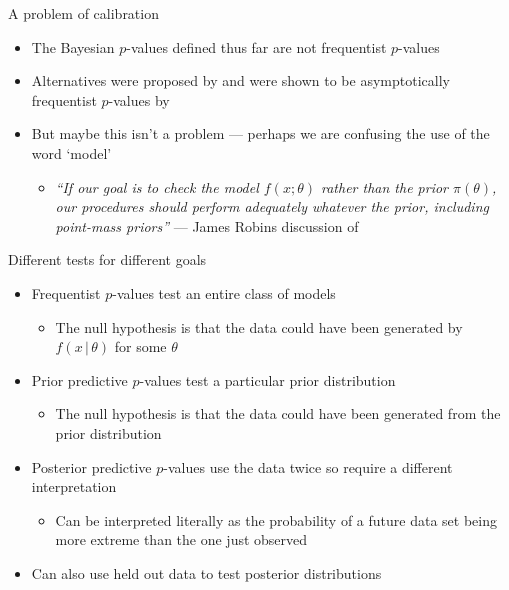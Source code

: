 \begin{frame}{A problem of calibration}
  \begin{itemize}
    \item The Bayesian $p$-values defined thus far are not frequentist $p$-values
    \vspace{\baselineskip}
    \pause
    \item Alternatives were proposed by \cite{Bayarri1999-ty} and were shown to be asymptotically frequentist $p$-values by \cite{Robins2000-oz}
    \vspace{\baselineskip}
    \pause
    \item But maybe this isn't a problem --- perhaps we are confusing the use of the word `model'
    \begin{itemize}
      \item \textit{``If our goal is to check the model $f(x;\theta)$ rather than the prior $\pi(\theta)$, our procedures should perform adequately whatever the prior, including point-mass priors''} --- James Robins discussion of \cite{Bayarri1999-ty}
    \end{itemize}
  \end{itemize}
\end{frame}

\begin{frame}{Different tests for different goals}
  \begin{itemize}
    \item Frequentist $p$-values test an entire class of models
    \begin{itemize}
      \item The null hypothesis is that the data could have been generated by $f(x\,|\,\theta)$ for some $\theta$
    \end{itemize}
    \vspace{\baselineskip}
    \pause
    \item Prior predictive $p$-values test a particular prior distribution
    \begin{itemize}
      \item The null hypothesis is that the data could have been generated from the prior distribution
    \end{itemize}
    \vspace{\baselineskip}
    \pause
    \item Posterior predictive $p$-values use the data twice so require a different interpretation
    \begin{itemize}
      \item Can be interpreted literally as the probability of a future data set being more extreme than the one just observed
    \end{itemize}
    \vspace{\baselineskip}
    \pause
    \item Can also use held out data to test posterior distributions
  \end{itemize}
\end{frame}

